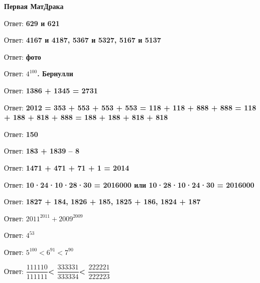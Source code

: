 \centerline{\bf \Huge Первая МатДрака}

 Ответ: \textbf{629 и 621}

 Ответ: \textbf{4167 и 4187, 5367 и 5327, 5167 и 5137}

 Ответ: \textbf{фото}

 Ответ: \textbf{$4^{100}$. Бернулли}

 Ответ: \textbf{1386 + 1345 = 2731}

 Ответ: \textbf{2012 = 353 + 553 + 553 + 553 = 118 + 118 + 888 + 888 = 118 + 188 + 818 + 888 = 188 + 188 + 818 + 818}

 Ответ: \textbf{150}

 Ответ: \textbf{183 + 1839 – 8}

 Ответ: \textbf{1471 + 471 + 71 + 1 = 2014}

 Ответ: \textbf{10·24·10·28·30 = 2016000  или  10·28·10·24·30 = 2016000}

 Ответ: \textbf{1827 + 184,  1826 + 185,  1825 + 186,  1824 + 187}

 Ответ: \textbf{$2011^{2011} + 2009^{2009}$}

 Ответ: \textbf{$4^{53}$}

 Ответ: \textbf{$5^{100}< 6^{91}<7^{90}$}

 Ответ: \textbf{$\dfrac{111110}{111111}$< $\dfrac{333331}{333334}$< $\dfrac{222221}{222223}$}

